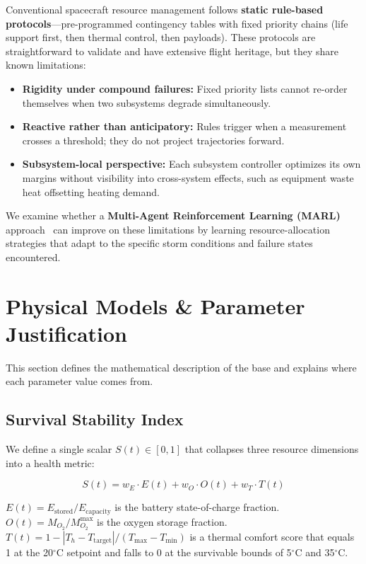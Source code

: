 \documentclass[11pt,a4paper]{article}
\begin{document}
Conventional spacecraft resource management follows \textbf{static rule-based protocols}---pre-programmed contingency tables with fixed priority chains (life support first, then thermal control, then payloads). These protocols are straightforward to validate and have extensive flight heritage, but they share known limitations:

\begin{itemize}
  \item \textbf{Rigidity under compound failures:} Fixed priority lists cannot re-order themselves when two subsystems degrade simultaneously.
  \item \textbf{Reactive rather than anticipatory:} Rules trigger when a measurement crosses a threshold; they do not project trajectories forward.
  \item \textbf{Subsystem-local perspective:} Each subsystem controller optimizes its own margins without visibility into cross-system effects, such as equipment waste heat offsetting heating demand.
\end{itemize}

We examine whether a \textbf{Multi-Agent Reinforcement Learning (MARL)} approach~\cite{marl_survey} can improve on these limitations by learning resource-allocation strategies that adapt to the specific storm conditions and failure states encountered.

\section{Physical Models \& Parameter Justification}

This section defines the mathematical description of the base and explains where each parameter value comes from.

\subsection{Survival Stability Index}

We define a single scalar $S(t) \in [0,1]$ that collapses three resource dimensions into a health metric:

\begin{equation}\label{eq:S}
  S(t) = w_E \cdot E(t) + w_O \cdot O(t) + w_T \cdot T(t)
\end{equation}

$E(t) = E_{\text{stored}} / E_{\text{capacity}}$ is the battery state-of-charge fraction. $O(t) = M_{O_2} / M_{O_2}^{\text{max}}$ is the oxygen storage fraction. $T(t) = 1 - |T_h - T_{\text{target}}| / (T_{\text{max}} - T_{\text{min}})$ is a thermal comfort score that equals 1 at the 20$^\circ$C setpoint and falls to 0 at the survivable bounds of 5$^\circ$C and 35$^\circ$C.
\end{document}
